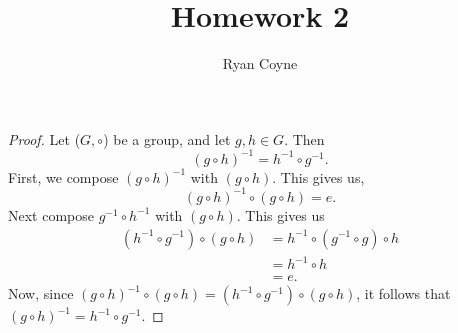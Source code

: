 \documentclass[12pt]{article}
\title{Homework 2}
\author{Ryan Coyne}
\begin{document}
    \maketitle

    \begin{proof}{Let (\(G, \circ\)) be a group, and let \(g, h\in G\). Then 
        \begin{equation*}
            (g\circ h)^{-1} = h^{-1} \circ g^{-1}.
        \end{equation*}}
        First, we compose \((g \circ h)^{-1}\) with \((g\circ h)\). This gives us, \[(g \circ h)^{-1}\circ(g\circ h) = e.\] Next compose \(g^{-1}\circ h^{-1}\) with \((g\circ h)\). This gives us \begin{align*}
            (h^{-1}\circ g^{-1}) \circ (g\circ h) &= h^{-1} \circ (g^{-1} \circ g) \circ h\\
            & = h^{-1} \circ h\\
            & = e.
        \end{align*}
        Now, since \((g \circ h)^{-1}\circ(g\circ h) = (h^{-1}\circ g^{-1}) \circ (g\circ h)\), it follows that \((g \circ h)^{-1} = h^{-1}\circ g^{-1}\).
    \end{proof}
\end{document}
